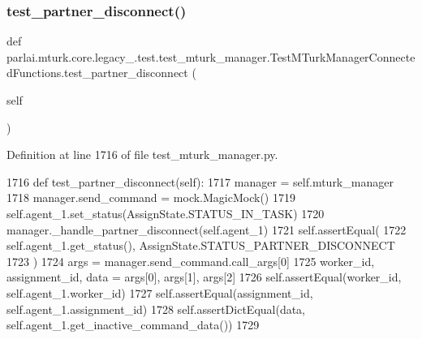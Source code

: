 \subsubsection{\texorpdfstring{test\+\_\+partner\+\_\+disconnect()}{test\_partner\_disconnect()}}
{\footnotesize\ttfamily def parlai.\+mturk.\+core.\+legacy\+\_.\+test.\+test\+\_\+mturk\+\_\+manager.\+Test\+M\+Turk\+Manager\+Connected\+Functions.\+test\+\_\+partner\+\_\+disconnect (\begin{DoxyParamCaption}\item[{}]{self }\end{DoxyParamCaption})}



Definition at line 1716 of file test\+\_\+mturk\+\_\+manager.\+py.


\begin{DoxyCode}
1716     \textcolor{keyword}{def }test\_partner\_disconnect(self):
1717         manager = self.mturk\_manager
1718         manager.send\_command = mock.MagicMock()
1719         self.agent\_1.set\_status(AssignState.STATUS\_IN\_TASK)
1720         manager.\_handle\_partner\_disconnect(self.agent\_1)
1721         self.assertEqual(
1722             self.agent\_1.get\_status(), AssignState.STATUS\_PARTNER\_DISCONNECT
1723         )
1724         args = manager.send\_command.call\_args[0]
1725         worker\_id, assignment\_id, data = args[0], args[1], args[2]
1726         self.assertEqual(worker\_id, self.agent\_1.worker\_id)
1727         self.assertEqual(assignment\_id, self.agent\_1.assignment\_id)
1728         self.assertDictEqual(data, self.agent\_1.get\_inactive\_command\_data())
1729 
\end{DoxyCode}
\mbox{\label{classparlai_1_1mturk_1_1core_1_1legacy__2018_1_1test_1_1test__mturk__manager_1_1TestMTurkManagerConnectedFunctions_a91fac908341313e5f400b6179625d13f}} 
